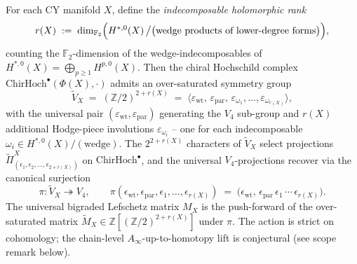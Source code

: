 \begin{theorem}
\label{thm:oversaturation-hierarchy}
For each CY manifold $X$, define the
\emph{indecomposable holomorphic rank}
\[
 r(X)
 \;:=\; \dim_{\mathbb{F}_2}\Bigl(H^{*, 0}(X) \,\big/ \bigl(\text{wedge
 products of lower-degree forms}\bigr)\Bigr),
\]
counting the $\mathbb{F}_2$-dimension of the wedge-indecomposables of
$H^{*, 0}(X) = \bigoplus_{p \geq 1} H^{p, 0}(X)$. Then the chiral
Hochschild complex $\mathrm{ChirHoch}^\bullet(\Phi(X), \cdot)$ admits
an over-saturated symmetry group
\[
 \widetilde{V}_X
 \;=\; (\mathbb{Z}/2)^{2 + r(X)}
 \;=\; \langle \varepsilon_{\mathrm{wt}},\, \varepsilon_{\mathrm{par}},\,
 \varepsilon_{\omega_1}, \dots, \varepsilon_{\omega_{r(X)}} \rangle,
\]
with the universal pair
$(\varepsilon_{\mathrm{wt}}, \varepsilon_{\mathrm{par}})$
generating the $V_4$ sub-group and $r(X)$ additional Hodge-piece
involutions $\varepsilon_{\omega_i}$ -- one for each indecomposable
$\omega_i \in H^{*, 0}(X) / (\text{wedge})$. The $2^{2 + r(X)}$
characters of $\widetilde{V}_X$ select projections
$\widetilde{\Pi}^X_{(\epsilon_1, \epsilon_2, \dots,
\epsilon_{2 + r(X)})}$ on $\mathrm{ChirHoch}^\bullet$, and the universal
$V_4$-projections recover via the canonical surjection
\[
 \pi : \widetilde{V}_X \twoheadrightarrow V_4,
 \qquad
 \pi(\epsilon_{\mathrm{wt}}, \epsilon_{\mathrm{par}},
 \epsilon_1, \dots, \epsilon_{r(X)})
 \;=\; \bigl(\epsilon_{\mathrm{wt}},\,
 \epsilon_{\mathrm{par}}\,\epsilon_1\,\cdots\,
 \epsilon_{r(X)}\bigr).
\]
The universal bigraded Lefschetz matrix $M_X$ is the push-forward
of the over-saturated matrix
$\widetilde{M}_X \in \mathbb{Z}[(\mathbb{Z}/2)^{2 + r(X)}]$ under $\pi$.
The action is strict on cohomology; the chain-level $A_\infty$-up-to-homotopy
lift is conjectural (see scope remark below).
\end{theorem}

